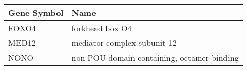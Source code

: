 \begin{tabular}{ll}
\toprule
Gene Symbol &                                       Name \\
\midrule
      FOXO4 &                            forkhead box O4 \\
      MED12 &                mediator complex subunit 12 \\
       NONO & non-POU domain containing, octamer-binding \\
\bottomrule
\end{tabular}
